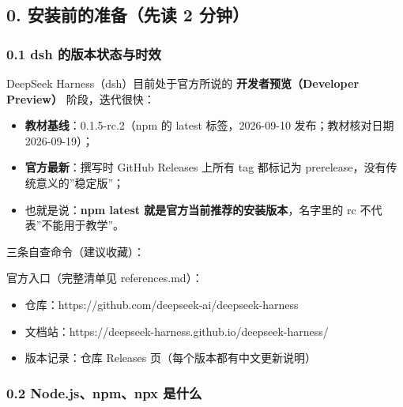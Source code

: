 \subsection{0. 安装前的准备（先读 2
分钟）}\label{ux5b89ux88c5ux524dux7684ux51c6ux5907ux5148ux8bfb-2-ux5206ux949f}

\subsubsection{0.1 dsh
的版本状态与时效}\label{dsh-ux7684ux7248ux672cux72b6ux6001ux4e0eux65f6ux6548}

DeepSeek Harness（dsh）目前处于官方所说的 \textbf{开发者预览（Developer
Preview）} 阶段，迭代很快：

\begin{itemize}
\tightlist
\item
  \textbf{教材基线}：0.1.5-rc.2（npm 的 latest 标签，2026-09-10
  发布；教材核对日期 2026-09-19）；
\item
  \textbf{官方最新}：撰写时 GitHub Releases 上所有 tag 都标记为
  prerelease，没有传统意义的''稳定版''；
\item
  也就是说：\textbf{npm latest 就是官方当前推荐的安装版本}，名字里的 rc
  不代表''不能用于教学''。
\end{itemize}

三条自查命令（建议收藏）：

\begin{Shaded}
\begin{Highlighting}[]
                           
\end{Highlighting}
\end{Shaded}

官方入口（完整清单见 references.md）：

\begin{itemize}
\tightlist
\item
  仓库：https://github.com/deepseek-ai/deepseek-harness
\item
  文档站：https://deepseek-harness.github.io/deepseek-harness/
\item
  版本记录：仓库 Releases 页（每个版本都有中文更新说明）
\end{itemize}

\subsubsection{0.2 Node.js、npm、npx
是什么}\label{node.jsnpmnpx-ux662fux4ec0ux4e48}

